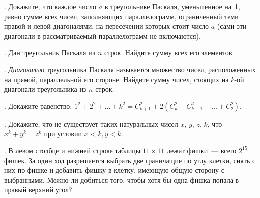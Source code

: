 . Докажите, что каждое число $a$ в треугольнике Паскаля,
уменьшенное на~1, равно сумме всех чисел, заполняющих
параллелограмм, ограниченный теми правой и левой диагоналями, на
пересечении которых стоит число $a$ (сами эти диагонали в
рассматриваемый параллелограмм не включаются).

. Дан треугольник Паскаля из $n$ строк. Найдите сумму всех его
элементов.

. {\it Диагональю} треугольника Паскаля называется множество
чисел, расположенных на прямой, параллельной его стороне. Найдите
сумму чисел, стоящих на $k$-ой диагонали треугольника из $n$ строк.

. Докажите равенство:
$1^2+2^2+\ldots+k^2=C_{k+1}^2+2(C_k^2+C_{k-1}^2+\ldots+C_2^2)$.

. Докажите, что не существует таких натуральных чисел $x$, $y$,
$z$, $k$, что $x^k + y^k = z^k$  при условии  $x < k,  y < k$.

. В левом столбце и нижней строке таблицы $11 \times 11$ лежат
фишки~--- всего $2^{15}$ фишек. За один ход разрешается выбрать две
граничащие по углу клетки, снять с них по фишке и добавить фишку в
клетку, имеющую общую сторону с выбранными. Можно ли добиться того,
чтобы хотя бы одна фишка попала в правый верхний угол?
